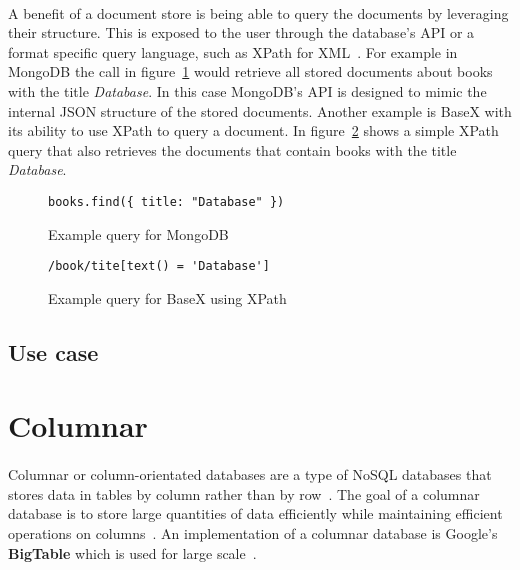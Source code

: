 \documentclass{CRPITStyle}
\renewcommand{\cite}{\citep}
\begin{document}
\paragraph{}
A benefit of a document store is being able to query the documents
by leveraging their structure.
This is exposed to the user through the database's API or a format specific
query language, such as XPath for XML~\cite{xpath}.
For example in MongoDB the call in figure~\ref{lst:mongo} would retrieve all
stored documents about books with the title \textit{Database}.
In this case MongoDB's API is designed to mimic the internal JSON structure 
of the stored documents.
Another example is BaseX with its ability to use XPath to query a document.
In figure~\ref{lst:basex} shows a simple XPath query that also retrieves
the documents that contain books with the title \textit{Database}.

\begin{figure}
\begin{verbatim}
books.find({ title: "Database" })
\end{verbatim}
\caption{Example query for MongoDB}
\label{lst:mongo}
\end{figure}

\begin{figure}
\begin{verbatim}
/book/tite[text() = 'Database']
\end{verbatim}
\caption{Example query for BaseX using XPath}
\label{lst:basex}
\end{figure}

\subsection{Use case}

\cite{nosql_performance}


\section{Columnar}

\paragraph{}
Columnar or column-orientated databases are a type of NoSQL databases that
stores data in tables by column rather than by row~\cite{nosql_survey}.
The goal of a columnar database is to store large quantities of data efficiently
while maintaining efficient operations on columns~\cite{nosql_survey,nosql_eval}.
An implementation of a columnar database is Google's
\textbf{BigTable} which is used for large scale~\cite{bigtable}.
\end{document}
